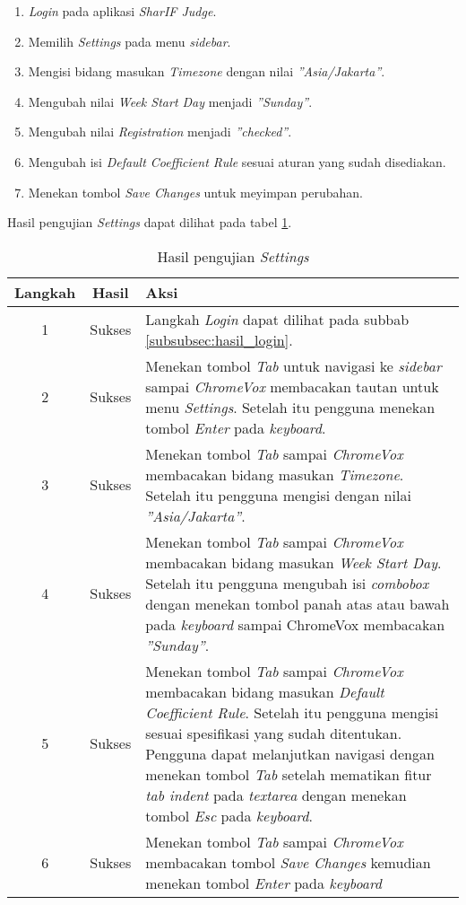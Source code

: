 \begin{enumerate}
	\item \textit{Login} pada aplikasi \textit{SharIF Judge}.
	\item Memilih \textit{Settings} pada menu \textit{sidebar}.
	\item Mengisi bidang masukan \textit{Timezone} dengan nilai \textit{''Asia/Jakarta''}.
	\item Mengubah nilai \textit{Week Start Day} menjadi \textit{''Sunday''}.
	\item Mengubah nilai \textit{Registration} menjadi \textit{''checked''}.
	\item Mengubah isi \textit{Default Coefficient Rule} sesuai aturan yang sudah disediakan.
	\item Menekan tombol \textit{Save Changes} untuk meyimpan perubahan.
\end{enumerate}

Hasil pengujian \textit{Settings} dapat dilihat pada tabel \ref{tab:hasil_settings}.

\begin{table}[H]
	\centering
	\caption{Hasil pengujian \textit{Settings}}
	\label{tab:hasil_settings}
	\begin{tabular}{|c|c|p{12cm}|}
		\toprule
		Langkah & Hasil & Aksi\\
		\midrule
		1 & Sukses & Langkah \textit{Login} dapat dilihat pada subbab \ref{subsubsec:hasil_login}.\\
		2 & Sukses & Menekan tombol \textit{Tab} untuk navigasi ke \textit{sidebar} sampai \textit{ChromeVox} membacakan tautan untuk menu \textit{Settings}. Setelah itu pengguna menekan tombol \textit{Enter} pada \textit{keyboard}.\\
		3 & Sukses & Menekan tombol \textit{Tab} sampai \textit{ChromeVox} membacakan bidang masukan \textit{Timezone}. Setelah itu pengguna mengisi dengan nilai \textit{''Asia/Jakarta''}.\\
		4 & Sukses & Menekan tombol \textit{Tab} sampai \textit{ChromeVox} membacakan bidang masukan \textit{Week Start Day}. Setelah itu pengguna mengubah isi \textit{combobox} dengan menekan tombol panah atas atau bawah pada \textit{keyboard} sampai ChromeVox membacakan \textit{''Sunday''}.\\
		5 & Sukses & Menekan tombol \textit{Tab} sampai \textit{ChromeVox} membacakan bidang masukan \textit{Default Coefficient Rule}. Setelah itu pengguna mengisi sesuai spesifikasi yang sudah ditentukan. Pengguna dapat melanjutkan navigasi dengan menekan tombol \textit{Tab} setelah mematikan fitur \textit{tab indent} pada \textit{textarea} dengan menekan tombol \textit{Esc} pada \textit{keyboard}.\\
		6 & Sukses & Menekan tombol \textit{Tab} sampai \textit{ChromeVox} membacakan tombol \textit{Save Changes} kemudian menekan tombol \textit{Enter} pada \textit{keyboard}\\
		\bottomrule
	\end{tabular}
\end{table}

